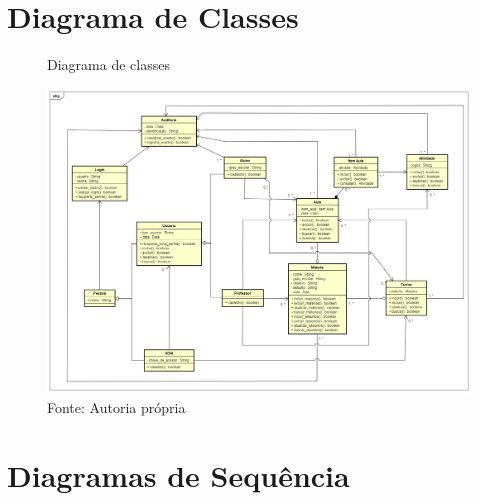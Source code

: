 \documentclass{utfpr-pg}
\begin{document}
\chapter{Diagrama de Classes}
    \label{chapter:diagrama de classes}
    \begin{figure}[H]
        \centering
        \captionsetup{width=\textwidth}
        \caption{Diagrama de classes}
        \includegraphics[width=\linewidth]{fotos/Diagrama de classe.png}
        \caption*{Fonte: Autoria própria}
        \label{fig:Diagrama de Classes}
    \end{figure}

\chapter{Diagramas de Sequência}
    \label{chapter:diagrama de sequencia}
\end{document}
